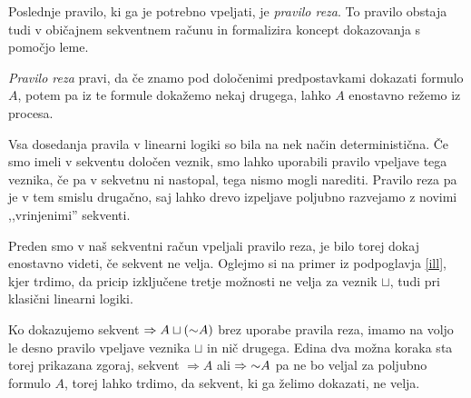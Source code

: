 Poslednje pravilo, ki ga je potrebno vpeljati, je \emph{pravilo reza}. To pravilo obstaja tudi v običajnem sekventnem računu in formalizira koncept dokazovanja s pomočjo leme.

\begin{definicija}
	\emph{Pravilo reza} pravi, da če znamo pod določenimi predpostavkami dokazati formulo $A$, potem pa iz te formule dokažemo nekaj drugega, lahko $A$ enostavno režemo iz procesa.
	\begin{prooftree}
	\end{prooftree}
\end{definicija}

\begin{opomba}
	Vsa dosedanja pravila v linearni logiki so bila na nek način deterministična. Če smo imeli v sekventu določen veznik, smo lahko uporabili pravilo vpeljave tega veznika, če pa v sekvetnu ni nastopal, tega nismo mogli narediti. Pravilo reza pa je v tem smislu drugačno, saj lahko drevo izpeljave poljubno razvejamo z novimi ,,vrinjenimi'' sekventi.
\end{opomba}
Preden smo v naš sekventni račun vpeljali pravilo reza, je bilo torej dokaj enostavno videti, če sekvent ne velja. Oglejmo si na primer iz podpoglavja \ref{ill}, kjer trdimo, da pricip izključene tretje možnosti ne velja za veznik $\sqcup$, tudi pri klasični linearni logiki.
\begin{center}
    \begin{bprooftree}
    \end{bprooftree}
    \begin{bprooftree}
    \end{bprooftree}
\end{center}
Ko dokazujemo sekvent $\Rightarrow A \sqcup (\negacija A)$ brez uporabe pravila reza, imamo na voljo le desno pravilo vpeljave veznika $\sqcup$ in nič drugega. Edina dva možna koraka sta torej prikazana zgoraj, sekvent $\Rightarrow A$ ali $\Rightarrow \negacija A$ pa ne bo veljal za poljubno formulo $A$, torej lahko trdimo, da sekvent, ki ga želimo dokazati, ne velja.

